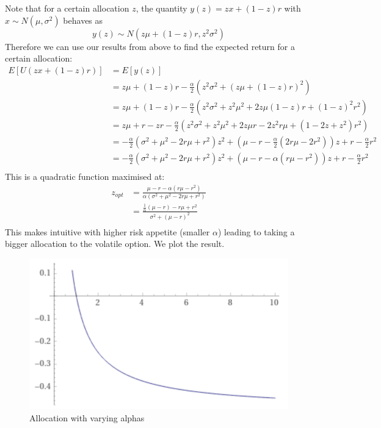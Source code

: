 \documentclass{article}[12pt]
\begin{document}
Note that for a certain allocation $z$, the quantity $y(z) = zx + (1-z)r$ with $x\sim N(\mu,\sigma^2) $ behaves as $$y(z)\sim N(z\mu+(1-z)r, z^2\sigma^2)$$ 
Therefore we can use our results from above to find the expected return for a certain allocation:
\begin{align*}
E[U(zx + (1-z)r)] &= E[y(z)]\\
&= z\mu+(1-z)r - \frac{\alpha}{2}(z^2\sigma^2 + (z\mu+(1-z)r)^2 )\\
&= z\mu+(1-z)r - \frac{\alpha}{2}(z^2\sigma^2 + z^2\mu^2 + 2z\mu(1-z)r + (1-z)^2r^2 )\\
&= z\mu+r -zr - \frac{\alpha}{2}(z^2\sigma^2 + z^2\mu^2 + 2z\mu r - 2z^2r\mu  + (1-2z + z^2)r^2 )\\
&=- \frac{\alpha}{2}(\sigma^2+ \mu^2-2r\mu+r^2)z^2  + (\mu -r - \frac{\alpha}{2}(2r\mu -2r^2))z + r - \frac{\alpha}{2}r^2\\
&=- \frac{\alpha}{2}(\sigma^2+ \mu^2-2r\mu+r^2)z^2  + (\mu -r - \alpha(r\mu -r^2))z + r - \frac{\alpha}{2}r^2\\
\end{align*}
This is a quadratic function maximised at:
\begin{align*}
z_{opt} &= \frac{\mu -r - \alpha(r\mu -r^2)}{\alpha(\sigma^2+ \mu^2-2r\mu+r^2)}\\
&= \frac{\frac{1}{\alpha}(\mu -r) -r\mu +r^2}{\sigma^2+ (\mu-r)^2}\\
\end{align*}
This makes intuitive with higher risk appetite (smaller $\alpha$) leading to taking a bigger allocation to the volatile option. We plot the result.

\begin{figure}
  \includegraphics[width=\linewidth]{plot_allocation.png}
  \caption{Allocation with varying alphas}
  \label{fig:llp3}
\end{figure}
\end{document}
